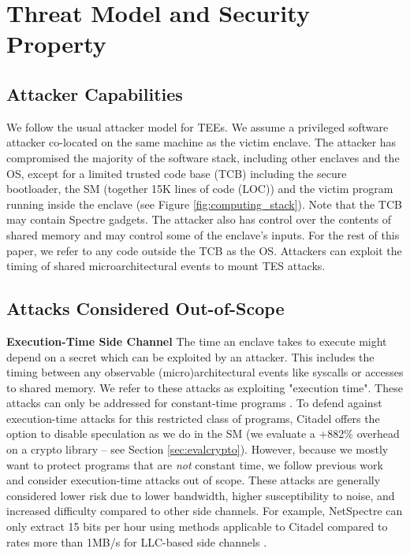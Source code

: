 \section{Threat Model and Security Property}
\label{sec:threatmodel}

\subsection{Attacker Capabilities}
We follow the usual attacker model for TEEs.
We assume a privileged software attacker co-located on the same machine as the victim enclave.
The attacker has compromised the majority of the software stack, including other enclaves and the OS, except for a limited trusted code base (TCB) including the secure bootloader, the SM (together 15K lines of code (LOC)) and the victim program running inside the enclave (see Figure \ref{fig:computing_stack}).
Note that the TCB may contain Spectre gadgets.
The attacker also has control over the contents of shared memory and may control some of the enclave's inputs.
For the rest of this paper, we refer to any code outside the TCB as the OS.
Attackers can exploit the timing of shared microarchitectural events to mount TES attacks.

\subsection{Attacks Considered Out-of-Scope}
\noindent\textbf{Execution-Time Side Channel}
\label{sec:execution_time_SC}
The time an enclave takes to execute might depend on a secret which can be exploited by an attacker.
This includes the timing between any observable (micro)architectural events like syscalls or accesses to shared memory.
We refer to these attacks as exploiting "execution time".
These attacks can only be addressed for constant-time programs \cite{daniel2023prospect, daniel2021hunting, schwarz2020context, choudhary2021speculative, yu2019speculative}. 
To defend against execution-time attacks for this restricted class of programs, Citadel offers the option to disable speculation as we do in the SM (we evaluate a +882\% overhead on a crypto library -- see Section \ref{sec:evalcrypto}).
However, because we mostly want to protect programs that are \textit{not} constant time,
we follow previous work \cite{bourgeat2019mi6, khasawneh2019safespec, kiriansky2018dawg, sakalis2019efficient, li2019conditional, ainsworth2020muontrap, saileshwar2019cleanupspec, wang2019oo7} and consider execution-time attacks out of scope.
These attacks are generally considered lower risk due to lower bandwidth, higher susceptibility to noise, and increased difficulty compared to other side channels. 
For example, NetSpectre \cite{schwarz2019netspectre} can only extract 15 bits per hour using methods applicable to Citadel compared to rates more than 1MB/s for LLC-based side channels \cite{liu2015last}.

